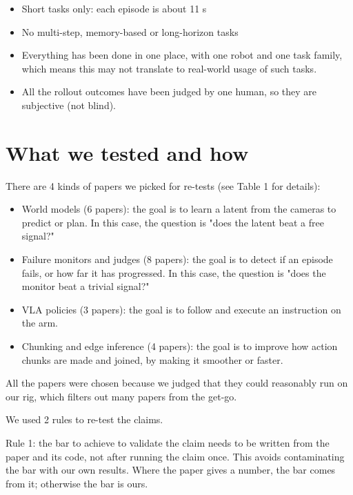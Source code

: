 \documentclass[10pt,twocolumn]{article}
\begin{document}
\begin{itemize}\setlength{\itemsep}{0pt}\setlength{\parskip}{0pt}\footnotesize
\item Short tasks only: each episode is about 11 s
\item No multi-step, memory-based or long-horizon tasks
\item Everything has been done in one place, with one robot and one task family, which means this may not translate to real-world usage of such tasks.
\item All the rollout outcomes have been judged by one human, so they are subjective (not blind).
\end{itemize}


\section{What we tested and how}


There are 4 kinds of papers we picked for re-tests (see Table 1 for details):


\begin{itemize}\setlength{\itemsep}{0pt}\setlength{\parskip}{0pt}\footnotesize
\item World models (6 papers): the goal is to learn a latent from the cameras to predict or plan. In this case, the question is "does the latent beat a free signal?"
\item Failure monitors and judges (8 papers): the goal is to detect if an episode fails, or how far it has progressed. In this case, the question is "does the monitor beat a trivial signal?"
\item VLA policies (3 papers): the goal is to follow and execute an instruction on the arm.
\item Chunking and edge inference (4 papers): the goal is to improve how action chunks are made and joined, by making it smoother or faster.
\end{itemize}


All the papers were chosen because we judged that they could reasonably run on our rig, which filters out many papers from the get-go.


We used 2 rules to re-test the claims.


Rule 1: the bar to achieve to validate the claim needs to be written from the paper and its code, not after running the claim once. This avoids contaminating the bar with our own results. Where the paper gives a number, the bar comes from it; otherwise the bar is ours.
\end{document}
